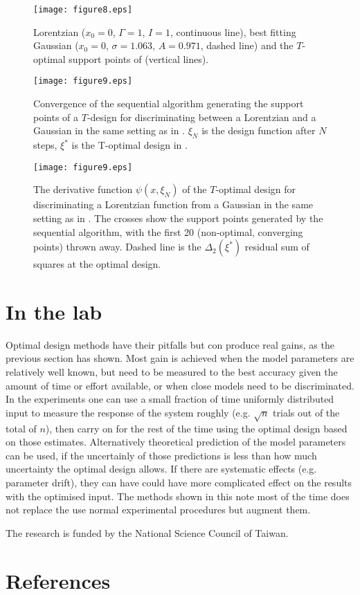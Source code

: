 \documentclass[12pt]{iopart}
\begin{document}
\begin{figure}
\texttt{[image: figure8.eps]}
\caption{Lorentzian ($x_0 = 0$, $\Gamma = 1$, $I = 1$, continuous line), best fitting Gaussian ($x_0 = 0$, $\sigma = 1.063$, $A = 0.971$, dashed line) and the $T$-optimal support points of  (vertical lines).}
\label{fig:lorgauss}
\end{figure}

\begin{figure}
\texttt{[image: figure9.eps]}
\caption{Convergence of the sequential algorithm generating the support points of a $T$-design for discriminating between a Lorentzian and a Gaussian in the same setting as in . $\xi_N$ is the design function after $N$ steps, $\xi^*$ is the T-optimal design in .}
\label{fig:toptconvergence}
\end{figure}

\begin{figure}
\texttt{[image: figure9.eps]}
\caption{The derivative function $\psi(x, \xi_N)$ of the $T$-optimal design for discriminating a Lorentzian function from a Gaussian in the same setting as in . The crosses show the support points generated by the sequential algorithm, with the first 20 (non-optimal, converging points) thrown away. Dashed line is the $\Delta_2(\xi^*)$ residual sum of squares at the optimal design.}
\label{fig:topt}
\end{figure}



\section{In the lab}

Optimal design methods have their pitfalls but con produce real gains, as the previous section has shown.  Most gain is achieved when the model parameters are relatively well known, but need to be measured to the best accuracy given the amount of time or effort available, or when close models need to be discriminated. In the experiments one can use a small fraction of time uniformly distributed input to measure the response of the system roughly (e.g. $\sqrt{n}$ trials out of the total of $n$), then carry on for the rest of the time using the optimal design based on those estimates. Alternatively theoretical prediction of the model parameters can be used, if the uncertainly of those predictions is less than how much uncertainty the optimal design allows. If there are systematic effects (e.g. parameter drift), they can have could have more complicated effect on the results with the optimised input. The methods shown in this note most of the time does not replace the use normal experimental procedures but augment them.


\ack The research is funded by the National Science Council of Taiwan.



\section*{References}


\end{document}
